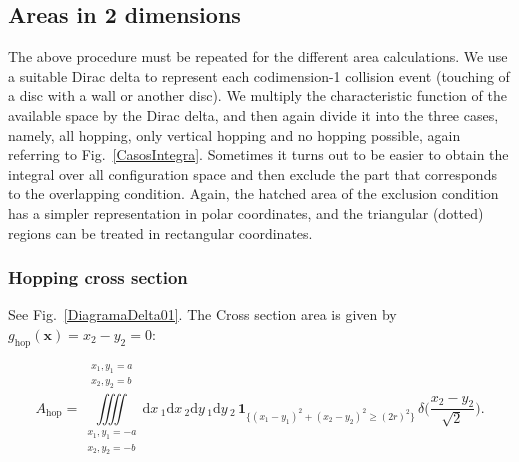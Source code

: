 \documentclass[superscriptaddress,pre,reprint,showpacs,twocolumn]{revtex4-1}
\newcommand{\rd}[1]{\mathrm{d}{#1} \,}
\newcommand{\indicatorsymbol}{\mathbf{1}}
\newcommand{\indicator}[1]{\indicatorsymbol_{ \{   #1 \} } }
\begin{document}
\subsection{Areas in 2 dimensions}

The above procedure must be repeated for the different
area calculations. We use a suitable Dirac delta to represent each codimension-1 collision
event (touching of a disc with a wall or another disc). We multiply the characteristic function of the available space by the Dirac delta, and
then again divide it into the three cases, namely, all hopping, only vertical hopping
and no hopping possible, again referring to Fig.~\ref{CasosIntegra}.
Sometimes it turns out to be easier to obtain 
the integral  over all configuration space and then exclude the part that
corresponds to the overlapping condition. Again, the hatched area of the exclusion
condition has a simpler representation in polar coordinates, and the triangular
(dotted) regions can be treated in rectangular coordinates.


\subsubsection{Hopping cross section}

See Fig.~\ref{DiagramaDelta01}. 
The Cross section area is given by
$g_\text{hop}(\mathbf{x}) = x_2 - y_2 = 0$:

\begin{widetext}\label{ahopcart}
\begin{equation}
  A_\text{hop} =
\iiiint
\limits_{\substack{x_1, y_1 = -a \\ x_2, y_2 = -b}}^{\substack{x_1, y_1 = a \\ x_2, y_2 = b}}
\rd x_1 \rd x_2 \rd y_1 \rd y_2 
 \, \indicator{ (x_1-y_1)^2 + (x_2-y_2)^2 \ge (2r)^2 } \, \delta \big(\frac{x_2-y_2}{\sqrt{2}}\big).
\end{equation}
\end{widetext}
\end{document}
